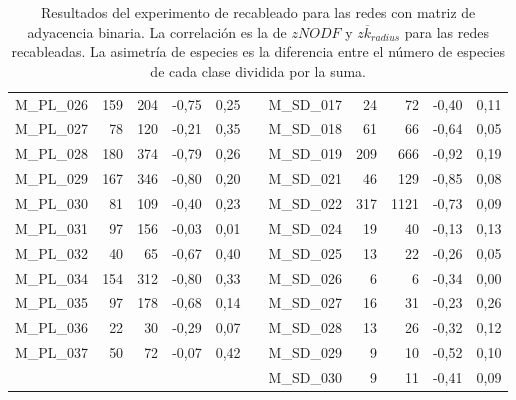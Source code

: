 \begin{table}[h!]
\begin{tabular}{lrrrrrlrrrr}
    M\_PL\_026 & 159  & 204  & -0,75 & 0,25 &      & M\_SD\_017 & 24   & 72   & -0,40 & 0,11 \\
    M\_PL\_027 & 78   & 120  & -0,21 & 0,35 &      & M\_SD\_018 & 61   & 66   & -0,64 & 0,05 \\
    M\_PL\_028 & 180  & 374  & -0,79 & 0,26 &      & M\_SD\_019 & 209  & 666  & -0,92 & 0,19 \\
    M\_PL\_029 & 167  & 346  & -0,80 & 0,20 &      & M\_SD\_021 & 46   & 129  & -0,85 & 0,08 \\
    M\_PL\_030 & 81   & 109  & -0,40 & 0,23 &      & M\_SD\_022 & 317  & 1121 & -0,73 & 0,09 \\
    M\_PL\_031 & 97   & 156  & -0,03 & 0,01 &      & M\_SD\_024 & 19   & 40   & -0,13 & 0,13 \\
    M\_PL\_032 & 40   & 65   & -0,67 & 0,40 &      & M\_SD\_025 & 13   & 22   & -0,26 & 0,05 \\
    M\_PL\_034 & 154  & 312  & -0,80 & 0,33 &      & M\_SD\_026 & 6    & 6    & -0,34 & 0,00 \\
    M\_PL\_035 & 97   & 178  & -0,68 & 0,14 &      & M\_SD\_027 & 16   & 31   & -0,23 & 0,26 \\
    M\_PL\_036 & 22   & 30   & -0,29 & 0,07 &      & M\_SD\_028 & 13   & 26   & -0,32 & 0,12 \\
    M\_PL\_037 & 50   & 72   & -0,07 & 0,42 &      & M\_SD\_029 & 9    & 10   & -0,52 & 0,10 \\
         &      &      &      &      &      & M\_SD\_030 & 9    & 11   & -0,41 & 0,09 \\
    \bottomrule
    \end{tabular}%
    \caption{\label{table:table_results_recableados} Resultados del experimento de recableado para las redes con matriz de adyacencia binaria. La correlación es la de $zNODF$ y $z \overline {k}_{radius}$ para las redes recableadas. La asimetría de especies es la diferencia entre el número de especies de cada clase dividida por la suma.}
\end{table}%

